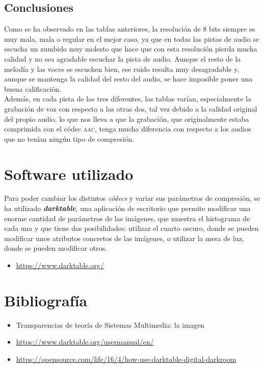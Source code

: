 \documentclass[11pt,a4paper]{article}
\begin{document}
\subsection{Conclusiones}

Como se ha observado en las tablas anteriores, la resolución de 8 bits siempre es muy mala, mala o regular en el mejor caso, ya que en todas las pistas de audio se escucha un zumbido muy molesto que hace que con esta resolución pierda mucha calidad y no sea agradable escuchar la pista de audio. Aunque el resto de la melodía y las voces se escuchen bien, ese ruido resulta muy desagradable y, aunque se mantenga la calidad del resto del audio, se hace imposible poner una buena calificación.\\

Además, en cada pista de las tres diferentes, las tablas varían, especialmente la grabación de voz con respecto a las otras dos, tal vez debido a la calidad original del propio audio, lo que nos lleva a que la grabación, que originalmente estaba comprimida con el códec \textsc{aac}, tenga mucha diferencia con respecto a los audios que no tenían ningún tipo de compresión.


\section{Software utilizado}

Para poder cambiar los distintos \textit{códecs} y variar sus parámetros de compresión, se ha utilizado \textbf{\textit{darktable}}, una aplicación de escritorio que permite modificar una enorme cantidad de parámetros de las imágenes, que muestra el histograma de cada una y que tiene dos posibilidades: utilizar el cuarto oscuro, donde se pueden modificar unos atributos concretos de las imágenes, o utilizar la mesa de luz, donde se pueden modificar otros.\\

\begin{itemize}
	\item \textcolor{blue}{\url{https://www.darktable.org/}}
\end{itemize}

\section{Bibliografía}

\begin{itemize}
	\item Transparencias de teoría de Sistemas Multimedia: la imagen
	\item \textcolor{blue}{\url{https://www.darktable.org/usermanual/en/}}
	\item \textcolor{blue}{\url{https://opensource.com/life/16/4/how-use-darktable-digital-darkroom}}
\end{itemize}
\end{document}

